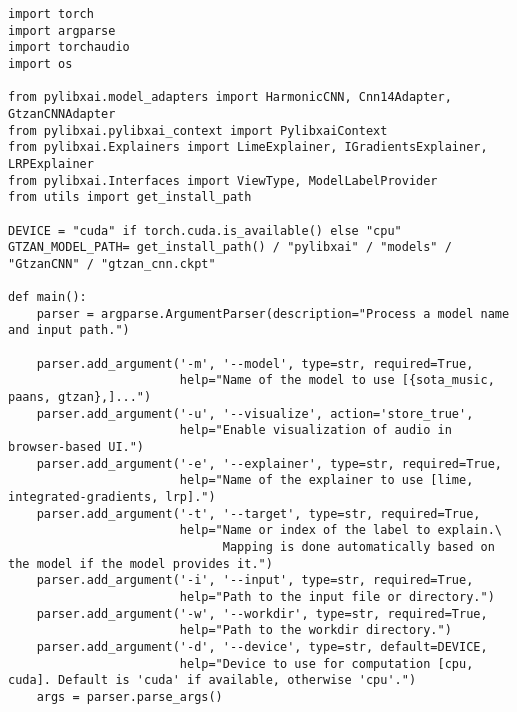 \documentclass[
    bindingoffset=5mm,  %
    footnoteindent=3mm, %
    hyphenation=true    %
]{src/wut-thesis}
\begin{document}
\listoffigurestoc    %
\vspace{1cm}         %
\listoftablestoc     %
\vspace{1cm}         %
\listofappendicestoc %


\captionsetup[figure]{list=no}
\captionsetup[table]{list=no}

\clearpage

 \label{appendix:ScriptListing}
\begin{verbatim}
import torch
import argparse
import torchaudio
import os

from pylibxai.model_adapters import HarmonicCNN, Cnn14Adapter, GtzanCNNAdapter
from pylibxai.pylibxai_context import PylibxaiContext
from pylibxai.Explainers import LimeExplainer, IGradientsExplainer, LRPExplainer
from pylibxai.Interfaces import ViewType, ModelLabelProvider
from utils import get_install_path

DEVICE = "cuda" if torch.cuda.is_available() else "cpu"
GTZAN_MODEL_PATH= get_install_path() / "pylibxai" / "models" / "GtzanCNN" / "gtzan_cnn.ckpt"

def main():
    parser = argparse.ArgumentParser(description="Process a model name and input path.")
    
    parser.add_argument('-m', '--model', type=str, required=True,
                        help="Name of the model to use [{sota_music, paans, gtzan},]...")
    parser.add_argument('-u', '--visualize', action='store_true',
                        help="Enable visualization of audio in browser-based UI.")
    parser.add_argument('-e', '--explainer', type=str, required=True,
                        help="Name of the explainer to use [lime, integrated-gradients, lrp].")
    parser.add_argument('-t', '--target', type=str, required=True,
                        help="Name or index of the label to explain.\
                              Mapping is done automatically based on the model if the model provides it.") 
    parser.add_argument('-i', '--input', type=str, required=True,
                        help="Path to the input file or directory.") 
    parser.add_argument('-w', '--workdir', type=str, required=True,
                        help="Path to the workdir directory.")
    parser.add_argument('-d', '--device', type=str, default=DEVICE,
                        help="Device to use for computation [cpu, cuda]. Default is 'cuda' if available, otherwise 'cpu'.")
    args = parser.parse_args()
    

\end{verbatim}
\end{document}
